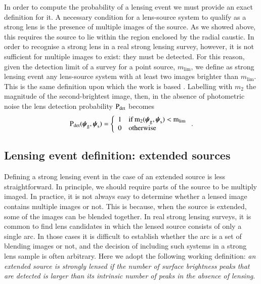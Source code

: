\documentclass{aa}
\def\psilens{\boldsymbol{\psi}_\mathrm{g}}
\def\psisource{\boldsymbol{\psi}_\mathrm{s}}
\def\pdet{{\rm P}_\mathrm{det}}
\begin{document}
In order to compute the probability of a lensing event we must provide an exact definition for it.
A necessary condition for a lens-source system to qualify as a strong lens is the presence of multiple images of the source.
As we showed above, this requires the source to lie within the region enclosed by the radial caustic.
In order to recognise a strong lens in a real strong lensing survey, however, it is not sufficient for multiple images to exist: they must be detected.
For this reason, given the detection limit of a survey for a point source, $m_{\mathrm{lim}}$, we define as strong lensing event any lens-source system with at least two images brighter than $m_{\mathrm{lim}}$.
This is the same definition upon which the \citet{MVK09} work is based \citep{VMK09}.
Labelling with $m_2$ the magnitude of the second-brightest image, then, in the absence of photometric noise the lens detection probability $\pdet$ becomes
\begin{equation}\label{eq:pointdet}
\pdet(\psilens,\psisource) = \left\{\begin{array}{ll} 1 & \rm{if}\,m_2(\psilens,\psisource) < m_{\mathrm{lim}} \\
0 & \rm{otherwise}\end{array}\right. .
\end{equation}

\subsection{Lensing event definition: extended sources}\label{ssec:lensdefext}

Defining a strong lensing event in the case of an extended source is less straightforward.
In principle, we should require parts of the source to be multiply imaged.
In practice, it is not always easy to determine whether a lensed image contains multiple images or not.
This is because, when the source is extended, some of the images can be blended together.
In real strong lensing surveys, it is common to find lens candidates in which the lensed source consists of only a single arc. In those cases it is difficult to establish whether the arc is a set of blending images or not, and the decision of including such systems in a strong lens sample is often arbitrary.
Here we adopt the following working definition: {\em an extended source is strongly lensed if the number of surface brightness peaks that are detected is larger than its intrinsic number of peaks in the absence of lensing}.
\end{document}
